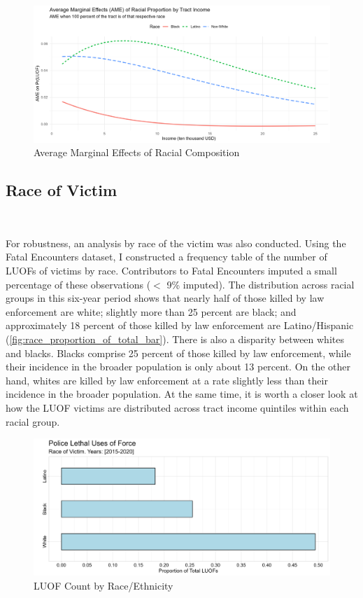 \documentclass[12pt]{article}
\begin{document}
\begin{figure}[H]
  \centering
  \includegraphics[width=\linewidth]{images/ame_race_by_income}
  \captionsetup{justification=centering, singlelinecheck=false, margin=2cm}
  \caption{Average Marginal Effects of Racial Composition}
  \label{fig:ame_race_by_income}
\end{figure}

\subsection{Race of Victim}\

For robustness, an analysis by race of the victim was also conducted. Using the Fatal Encounters dataset, I constructed a frequency table of the number of LUOFs of victims by race. Contributors to Fatal Encounters imputed a small percentage of these observations ($<$ 9\% imputed). The distribution across racial groups in this six-year period shows that nearly half of those killed by law enforcement are white; slightly more than 25 percent are black; and approximately 18 percent of those killed by law enforcement are Latino/Hispanic (\autoref{fig:race_proportion_of_total_bar}). There is also a disparity between whites and blacks. Blacks comprise 25 percent of those killed by law enforcement, while their incidence in the broader population is only about 13 percent. On the other hand, whites are killed by law enforcement at a rate slightly less than their incidence in the broader population. At the same time, it is worth a closer look at how the LUOF victims are distributed across tract income quintiles within each racial group.

\begin{figure}[H]
  \centering
  \includegraphics[width=\linewidth]{images/race_proportion_of_total_bar}
  \captionsetup{justification=centering, singlelinecheck=false, margin=2cm}
  \caption{LUOF Count by Race/Ethnicity}
  \label{fig:race_proportion_of_total_bar}
\end{figure}
\end{document}
